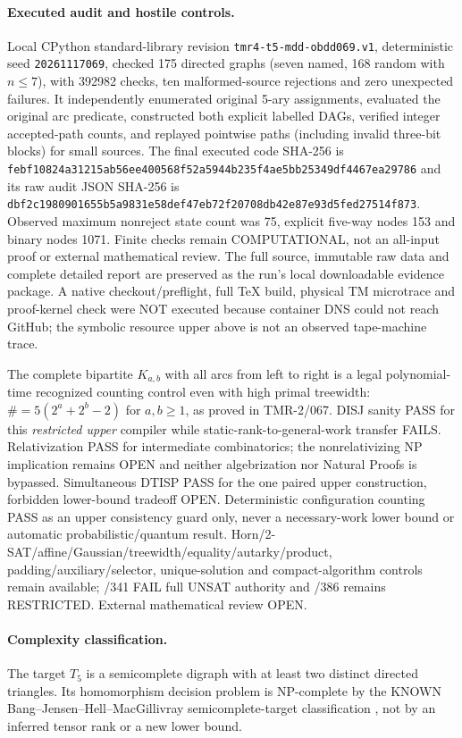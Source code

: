 \documentclass[11pt]{article}
\begin{document}
\paragraph{Executed audit and hostile controls.}
Local CPython standard-library revision
\texttt{tmr4-t5-mdd-obdd069.v1}, deterministic seed
\texttt{20261117069}, checked 175 directed graphs
(seven named, 168 random with $n\le7$), with 392982 checks,
ten malformed-source rejections and zero unexpected failures.
It independently enumerated original 5-ary assignments, evaluated
the original arc predicate, constructed both explicit labelled
DAGs, verified integer accepted-path counts, and replayed
pointwise paths (including invalid three-bit blocks) for small
sources. The final executed code SHA-256 is
\texttt{febf10824a31215ab56ee400568f52a5944b235f4ae5bb25349df4467ea29786}
and its raw audit JSON SHA-256 is
\texttt{dbf2c1980901655b5a9831e58def47eb72f20708db42e87e93d5fed27514f873}.
Observed maximum nonreject state count was 75, explicit
five-way nodes 153 and binary nodes 1071. Finite checks remain
COMPUTATIONAL, not an all-input proof or external mathematical review.
The full source, immutable raw data and complete detailed report are
preserved as the run's local downloadable evidence package.
A native checkout/preflight, full TeX build, physical TM microtrace
and proof-kernel check were NOT executed because container DNS
could not reach GitHub; the symbolic resource upper above is not
an observed tape-machine trace.

The complete bipartite $K_{a,b}$ with all arcs from left to right
is a legal polynomial-time recognized counting control even with high
primal treewidth: $\#=5(2^a+2^b-2)$ for $a,b\ge1$, as proved in
TMR-2/067. DISJ sanity PASS for this \emph{restricted upper}
compiler while static-rank-to-general-work transfer FAILS.
Relativization PASS for intermediate combinatorics; the
nonrelativizing NP implication remains OPEN and neither
algebrization nor Natural Proofs is bypassed. Simultaneous DTISP
PASS for the one paired upper construction, forbidden
lower-bound tradeoff OPEN. Deterministic configuration counting
PASS as an upper consistency guard only, never a necessary-work
lower bound or automatic probabilistic/quantum result.
Horn/2-SAT/affine/Gaussian/treewidth/equality/autarky/product,
padding/auxiliary/selector, unique-solution and compact-algorithm
controls remain available; /341 FAIL full UNSAT authority and
/386 remains RESTRICTED. External mathematical review OPEN.

\paragraph{Complexity classification.}
The target $T_5$ is a semicomplete digraph with at least two
distinct directed triangles. Its homomorphism decision problem is
NP-complete by the KNOWN Bang--Jensen--Hell--MacGillivray
semicomplete-target classification \cite{bangjensen1988},
not by an inferred tensor rank or a new lower bound.
\end{document}
